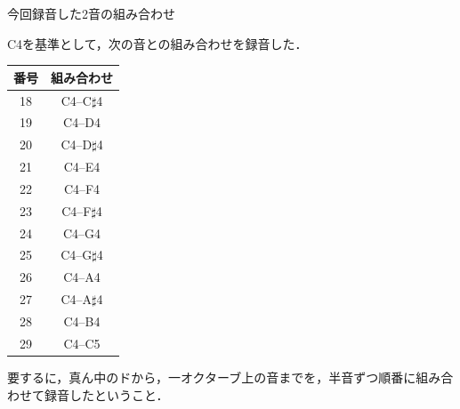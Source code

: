 \documentclass[dvipdfmx,uplatex]{beamer}
\begin{document}
\begin{frame}{今回録音した2音の組み合わせ}

  C4を基準として，次の音との組み合わせを録音した．

  \begin{table}[!ht]
    \centering
    \begin{tabular}{c|c}
      \hline
      番号 & 組み合わせ \\ \hline
      18 & C4--C$\sharp$4 \\
      19 & C4--D4 \\
      20 & C4--D$\sharp$4 \\
      21 & C4--E4 \\
      22 & C4--F4 \\
      23 & C4--F$\sharp$4 \\
      24 & C4--G4 \\
      25 & C4--G$\sharp$4 \\
      26 & C4--A4 \\
      27 & C4--A$\sharp$4 \\
      28 & C4--B4 \\
      29 & C4--C5 \\
      \hline
    \end{tabular}
  \end{table}

  要するに，真ん中のドから，一オクターブ上の音までを，半音ずつ順番に組み合わせて録音したということ．

\end{frame}
\end{document}

